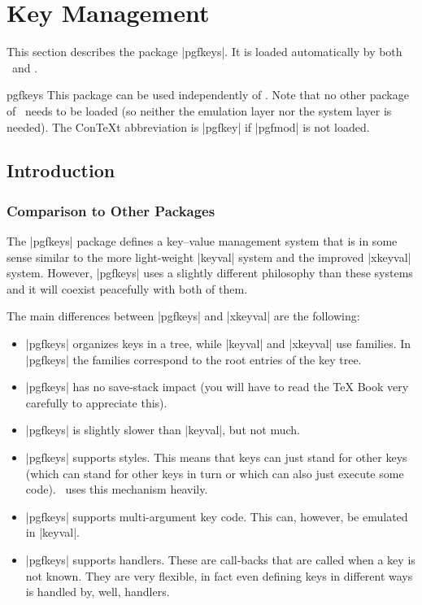 %
%
%


\section[pgfkeys]{Key Management}
\label{section-keys}

This section describes the package |pgfkeys|. It is loaded automatically by
both \pgfname\ and \tikzname.

\begin{package}{pgfkeys}
    This package can be used independently of \pgfname. Note that no
    other package of \pgfname\ needs to be loaded (so neither the
    emulation layer nor the system layer is needed). The Con\TeX t
    abbreviation is |pgfkey|  if |pgfmod| is not loaded.
\end{package}


\subsection{Introduction}

\subsubsection{Comparison to Other Packages}

The |pgfkeys| package defines a key--value management system that is in some
sense similar to the more light-weight |keyval| system and the improved
|xkeyval| system. However, |pgfkeys| uses a slightly different philosophy than
these systems and it will coexist peacefully with both of them.

The main differences between |pgfkeys| and |xkeyval| are the following:
%
\begin{itemize}
    \item |pgfkeys| organizes keys in a tree, while |keyval| and |xkeyval|
        use families. In |pgfkeys| the families correspond to the root
        entries of the key tree.
    \item |pgfkeys| has no save-stack impact (you will have to read the \TeX
        Book very carefully to appreciate this).
    \item |pgfkeys| is slightly slower than |keyval|, but not much.
    \item |pgfkeys| supports styles. This means that keys can just stand for
        other keys (which can stand for other keys in turn or which can also
        just execute some code). \tikzname\ uses this mechanism heavily.
    \item |pgfkeys| supports multi-argument key code. This can, however, be
        emulated in |keyval|.
    \item |pgfkeys| supports handlers. These are call-backs that are called
        when a key is not known. They are very flexible, in fact even
        defining keys in different ways is handled by, well, handlers.
\end{itemize}


